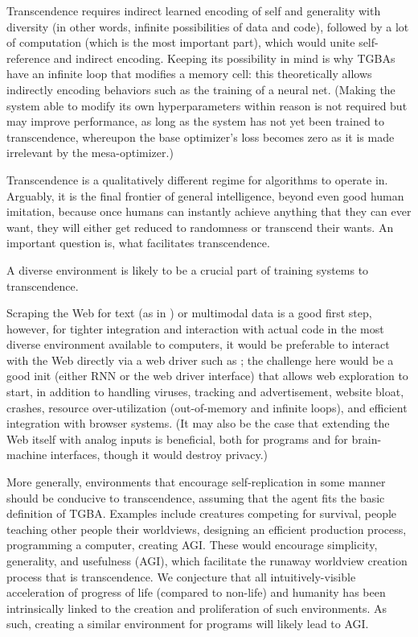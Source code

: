 \documentclass{article}
\begin{document}
Transcendence requires indirect learned encoding of self and generality with diversity (in other words, infinite possibilities of data and code), followed by a lot of computation (which is the most important part), which would unite self-reference and indirect encoding. Keeping its possibility in mind is why TGBAs have an infinite loop that modifies a memory cell: this theoretically allows indirectly encoding behaviors such as the training of a neural net. (Making the system able to modify its own hyperparameters within reason is not required but may improve performance, as long as the system has not yet been trained to transcendence, whereupon the base optimizer's loss becomes zero as it is made irrelevant by the mesa-optimizer.)

Transcendence is a qualitatively different regime for algorithms to operate in. Arguably, it is the final frontier of general intelligence, beyond even good human imitation, because once humans can instantly achieve anything that they can ever want, they will either get reduced to randomness or transcend their wants. An important question is, what facilitates transcendence.

A diverse environment is likely to be a crucial part of training systems to transcendence.

Scraping the Web for text (as in \cite{NEURIPS2020_1457c0d6}) or multimodal data is a good first step, however, for tighter integration and interaction with actual code in the most diverse environment available to computers, it would be preferable to interact with the Web directly via a web driver such as \cite{8117878}; the challenge here would be a good init (either RNN or the web driver interface) that allows web exploration to start, in addition to handling viruses, tracking and advertisement, website bloat, crashes, resource over-utilization (out-of-memory and infinite loops), and efficient integration with browser systems. (It may also be the case that extending the Web itself with analog inputs is beneficial, both for programs and for brain-machine interfaces, though it would destroy privacy.)

More generally, environments that encourage self-replication in some manner should be conducive to transcendence, assuming that the agent fits the basic definition of TGBA. Examples include creatures competing for survival, people teaching other people their worldviews, designing an efficient production process, programming a computer, creating AGI. These would encourage simplicity, generality, and usefulness (AGI), which facilitate the runaway worldview creation process that is transcendence. We conjecture that all intuitively-visible acceleration of progress of life (compared to non-life) and humanity has been intrinsically linked to the creation and proliferation of such environments. As such, creating a similar environment for programs will likely lead to AGI.
\end{document}
